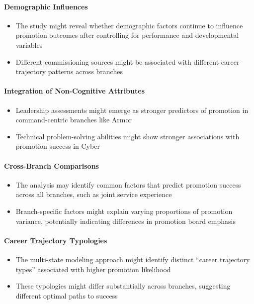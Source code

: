 \documentclass[../main.tex]{subfiles}
\begin{document}
\paragraph{Demographic Influences}
\begin{itemize}
\item The study might reveal whether demographic factors continue to influence promotion outcomes after controlling for performance and developmental variables
\item Different commissioning sources might be associated with different career trajectory patterns across branches
\end{itemize}

\paragraph{Integration of Non-Cognitive Attributes}
\begin{itemize}
\item Leadership assessments might emerge as stronger predictors of promotion in command-centric branches like Armor
\item Technical problem-solving abilities might show stronger associations with promotion success in Cyber
\end{itemize}

\paragraph{Cross-Branch Comparisons}
\begin{itemize}
\item The analysis may identify common factors that predict promotion success across all branches, such as joint service experience
\item Branch-specific factors might explain varying proportions of promotion variance, potentially indicating differences in promotion board emphasis
\end{itemize}

\paragraph{Career Trajectory Typologies}
\begin{itemize}
\item The multi-state modeling approach might identify distinct ``career trajectory types'' associated with higher promotion likelihood
\item These typologies might differ substantially across branches, suggesting different optimal paths to success
\end{itemize}
\end{document}
